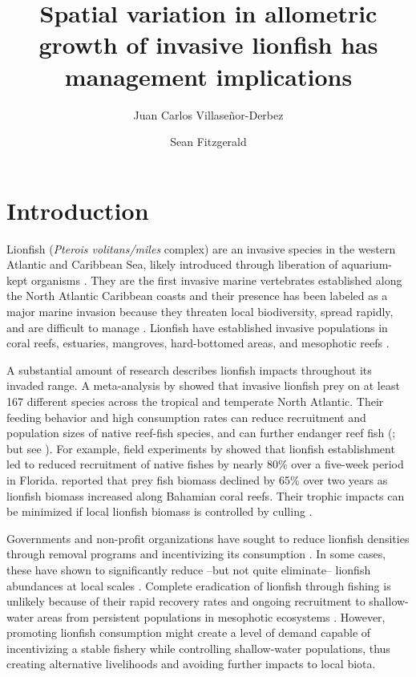 \documentclass[fleqn,10pt,lineno]{wlpeerj} %
\title{Spatial variation in allometric growth of invasive lionfish has
management implications}
\author[1]{Juan Carlos Villaseñor-Derbez}
\author[1]{Sean Fitzgerald}
\affil[1]{Bren School of Environmental Sciences and Management, University of California
  Santa Barbara, Santa Barbara, California, USA}
\begin{document}
\flushbottom
\maketitle
\thispagestyle{empty}

\section*{Introduction}

Lionfish (\emph{Pterois volitans/miles} complex) are an invasive species
in the western Atlantic and Caribbean Sea, likely introduced through
liberation of aquarium-kept organisms \citep{betancurr_2011}. They are
the first invasive marine vertebrates established along the North
Atlantic Caribbean coasts
\citep{schofield_2009,schofield_2010,sabidoitza_2016} and their presence
has been labeled as a major marine invasion because they threaten local
biodiversity, spread rapidly, and are difficult to manage
\citep{hixon_2016}. Lionfish have established invasive populations in
coral reefs, estuaries, mangroves, hard-bottomed areas, and mesophotic
reefs
\citep{barbour_2010,jud_2011,muoz_2011,claydon_2012,andradibrown_2017,gress_2017}.

A substantial amount of research describes lionfish impacts throughout
its invaded range. A meta-analysis by \citet{peake_2018} showed that
invasive lionfish prey on at least 167 different species across the
tropical and temperate North Atlantic. Their feeding behavior and high
consumption rates can reduce recruitment and population sizes of native
reef-fish species, and can further endanger reef fish
(\citet{green_2012,rocha_2015}; but see \citet{hackerott_2017}). For
example, field experiments by \citet{albins_2008} showed that lionfish
establishment led to reduced recruitment of native fishes by nearly 80\%
over a five-week period in Florida. \citet{green_2012} reported that
prey fish biomass declined by 65\% over two years as lionfish biomass
increased along Bahamian coral reefs. Their trophic impacts can be
minimized if local lionfish biomass is controlled by culling
\citep{ariasgonzalez_2011}.

Governments and non-profit organizations have sought to reduce lionfish
densities through removal programs and incentivizing its consumption
\citep{chin_2016}. In some cases, these have shown to significantly
reduce --but not quite eliminate-- lionfish abundances at local scales
\citep{deleon_2013,sandel_2015}. Complete eradication of lionfish
through fishing is unlikely because of their rapid recovery rates and
ongoing recruitment to shallow-water areas from persistent populations
in mesophotic ecosystems \citep{barbour_2011,andradibrown_2017}.
However, promoting lionfish consumption might create a level of demand
capable of incentivizing a stable fishery while controlling
shallow-water populations, thus creating alternative livelihoods and
avoiding further impacts to local biota.
\end{document}
